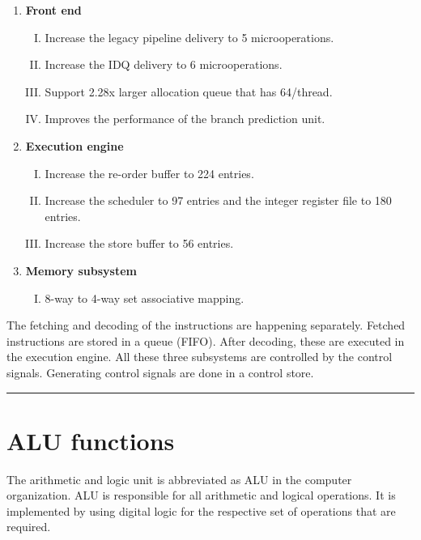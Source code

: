 \documentclass[a4paper,11pt]{article}
\begin{document}
 \begin{enumerate}[\hspace{1cm}1.]
 	\item \textbf{	Front end}
 	\begin{enumerate}[I.]
 		\item  	 Increase the legacy pipeline delivery to 5 microoperations.
 		\item Increase the IDQ delivery to 6 microoperations.
 		\item Support 2.28x larger allocation queue that has 64/thread.
 		\item Improves the performance of the branch prediction unit.
 	\end{enumerate}

 	\item\textbf{	Execution engine}
 	\begin{enumerate}[I.]
 		\item  	 Increase the re-order buffer to 224 entries.
 		\item Increase the scheduler to 97 entries and the integer register file to 180 entries.
 		\item Increase the store buffer to 56 entries.
 	\end{enumerate}

 	\item	\textbf{Memory subsystem}
 	\begin{enumerate}[I.]
 		\item 8-way to 4-way set associative mapping.
 	\end{enumerate}
 \end{enumerate}
The fetching and decoding of the instructions are happening separately. Fetched instructions are stored in a queue (FIFO). After decoding, these are executed in the execution engine. All these three subsystems are controlled by the control signals. Generating control signals are done in a control store.
\vspace{1cm}\hrule
\section{ALU functions}

The arithmetic and logic unit is abbreviated as ALU in the computer organization. ALU is responsible for all arithmetic and logical operations. It is implemented by using digital logic for the respective set of operations that are required.
\end{document}
